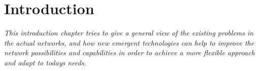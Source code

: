 \chapter{Introduction}
\label{ch:introduction}

\textit{This introduction chapter tries to give a general view of the existing problems in the actual networks, and how new emergent technologies can help to improve the network possibilities and capabilities in order to achieve a more flexible approach and adapt to todays needs.}





